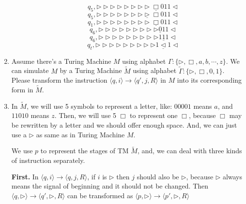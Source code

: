\documentclass[12pt,a4paper]{article}
\makeatletter
\newtheorem*{solution}{Solution}
\theoremstyle{definition}
\renewenvironment{solution}[1][Solution] {\par\pushQED{\qed}\normalfont\topsep6\p@\@plus6\p@\relax\trivlist\item[\hskip\labelsep\bfseries#1\@addpunct{.}]\ignorespaces}{\popQED\endtrivlist\@endpefalse} \makeatother
\makeatother
\begin{document}
\begin{enumerate}
\begin{enumerate}
			$$q_5,\triangleright\triangleright\triangleright\triangleright\triangleright\triangleright\triangleright\triangleright\underline{\Box}011\triangleleft$$
			$$q_5,\triangleright\triangleright\triangleright\triangleright\triangleright\triangleright\triangleright\underline{\triangleright}\Box011\triangleleft$$
			$$q_1,\triangleright\triangleright\triangleright\triangleright\triangleright\triangleright\triangleright\triangleright\underline{\Box}011\triangleleft$$
			$$q_6,\triangleright\triangleright\triangleright\triangleright\triangleright\triangleright\triangleright\triangleright\triangleright\underline{0}11\triangleleft$$
			$$q_6,\triangleright\triangleright\triangleright\triangleright\triangleright\triangleright\triangleright\triangleright\triangleright1\underline{1}1\triangleleft$$
			$$q_t,\triangleright\triangleright\triangleright\triangleright\triangleright\triangleright\triangleright\triangleright\triangleright1\underline{\triangleleft}1\triangleleft$$
			
			
		\end{enumerate}
		
		
		\item Assume there's a Turing Machine $M$ using alphabet $\Gamma :\{ \triangleright, \Box, a, b, \cdots, z\}$. We can simulate $M$ by a Turing Machine $\tilde{M}$ using alphabet $\tilde{\Gamma }:\{ \triangleright, \Box, 0, 1\}$. Please transform the instruction $\langle q, i \rangle \rightarrow \langle q',j, R\rangle$ in $M$ into its corresponding form in $\tilde{M}$.
		
		\begin{solution}
			In  $\tilde{M}$, we will use 5 symbols to represent a letter, like: $00001$ means $a$, and  $11010$ means $z$. Then, we will use 5 $\Box$ to represent one $\Box$, because $\Box$ may be rewritten by a letter and we should offer enough space. And, we can just use a $\triangleright$ as same as in Turing Machine $M$.
			
			We use $p$ to represent the stages of TM $\tilde{M}$, and, we can deal with three kinds of instruction separately.
			
			\textbf{First. }In $\langle q,i\rangle\rightarrow \langle q,j,R\rangle$, if $i$ is $\triangleright$ then $j$ should also be $\triangleright$, because $\triangleright$ always means the signal of beginning and it should not be changed.
			Then $\langle q,\triangleright\rangle \rightarrow \langle q',\triangleright,R\rangle $ can be transformed as $\langle p,\triangleright\rangle \rightarrow \langle p',\triangleright,R\rangle $
			

\end{solution}
\end{enumerate}
\end{document}
